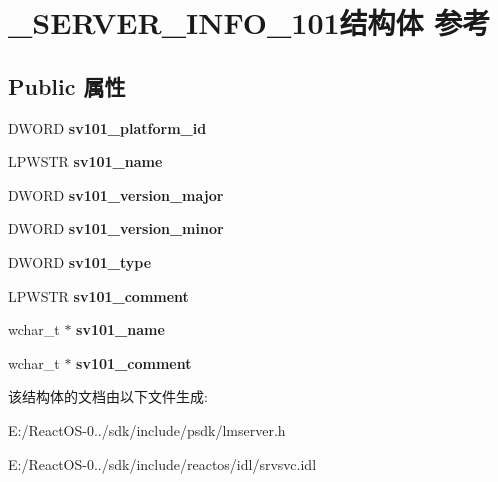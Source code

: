 \hypertarget{struct___s_e_r_v_e_r___i_n_f_o__101}{}\section{\+\_\+\+S\+E\+R\+V\+E\+R\+\_\+\+I\+N\+F\+O\+\_\+101结构体 参考}
\label{struct___s_e_r_v_e_r___i_n_f_o__101}
\subsection*{Public 属性}
\begin{DoxyCompactItemize}
\item 
\mbox{\label{struct___s_e_r_v_e_r___i_n_f_o__101_ac4784b21adcf88db837d9b04c0ee2a63}} 
D\+W\+O\+RD {\bfseries sv101\+\_\+platform\+\_\+id}
\item 
\mbox{\label{struct___s_e_r_v_e_r___i_n_f_o__101_a31a45723e938538fcc2e5a1a6810ce0d}} 
L\+P\+W\+S\+TR {\bfseries sv101\+\_\+name}
\item 
\mbox{\label{struct___s_e_r_v_e_r___i_n_f_o__101_a55a9c9de466c2aeeb2d46059d9b7d1f6}} 
D\+W\+O\+RD {\bfseries sv101\+\_\+version\+\_\+major}
\item 
\mbox{\label{struct___s_e_r_v_e_r___i_n_f_o__101_a297af54ba8d614958aff19e9c620a8b8}} 
D\+W\+O\+RD {\bfseries sv101\+\_\+version\+\_\+minor}
\item 
\mbox{\label{struct___s_e_r_v_e_r___i_n_f_o__101_acb09d8fe1d2d6114fc930b4c498ec569}} 
D\+W\+O\+RD {\bfseries sv101\+\_\+type}
\item 
\mbox{\label{struct___s_e_r_v_e_r___i_n_f_o__101_a34b5f0b2003422d1cba468a0b767facf}} 
L\+P\+W\+S\+TR {\bfseries sv101\+\_\+comment}
\item 
\mbox{\label{struct___s_e_r_v_e_r___i_n_f_o__101_a1bf19195d810a208df18d0c933160e28}} 
wchar\+\_\+t $\ast$ {\bfseries sv101\+\_\+name}
\item 
\mbox{\label{struct___s_e_r_v_e_r___i_n_f_o__101_a21dc9c9a853fa19ce59cb5de08b3569d}} 
wchar\+\_\+t $\ast$ {\bfseries sv101\+\_\+comment}
\end{DoxyCompactItemize}


该结构体的文档由以下文件生成\+:\begin{DoxyCompactItemize}
\item 
E\+:/\+React\+O\+S-\/0../sdk/include/psdk/lmserver.\+h\item 
E\+:/\+React\+O\+S-\/0../sdk/include/reactos/idl/srvsvc.\+idl\end{DoxyCompactItemize}
